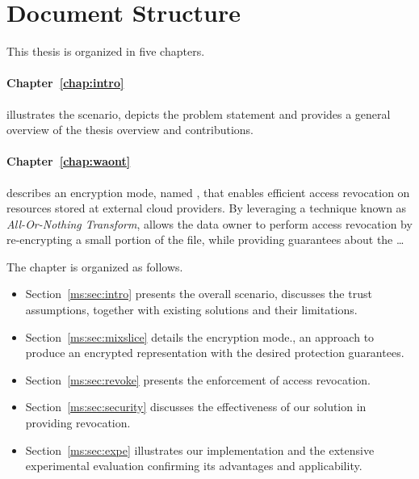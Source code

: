 {\bigskip

\bigskip

\section{Document Structure}


This thesis is organized in five chapters.

\smallskip

\paragraph*{Chapter~\ref{chap:intro}} illustrates the scenario, depicts the problem statement and provides a general overview of the thesis overview and contributions.

\paragraph*{Chapter~\ref{chap:waont}}
describes an encryption mode, named \name, that enables efficient access revocation on resources stored at external cloud providers. By leveraging a technique known as {\em All-Or-Nothing Transform}, \name allows the data owner to perform access revocation by re-encrypting a small portion of the file, while providing guarantees about the \ldots

\smallskip

The chapter is organized as follows.

\begin{itemize}
	\item Section~\ref{ms:sec:intro} presents the overall scenario, discusses the trust assumptions, together with existing solutions and their limitations.
	
	\item Section~\ref{ms:sec:mixslice} details the \name encryption mode., an approach to produce an encrypted representation with the desired protection guarantees.
	\item Section~\ref{ms:sec:revoke} presents the enforcement of access revocation. 
	
	\item Section~\ref{ms:sec:security} discusses the effectiveness of our solution in providing revocation.
	
	\item Section~\ref{ms:sec:expe} illustrates our implementation and the extensive experimental evaluation confirming its advantages and applicability. 
	

\end{itemize}}
